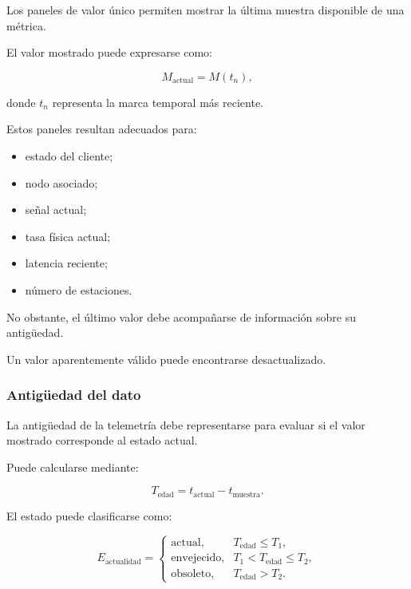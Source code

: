 Los paneles de valor único permiten mostrar la última muestra disponible
de una métrica.

El valor mostrado puede expresarse como:

\[
    M_{\mathrm{actual}}
    =
    M(t_n),
\]

donde \(t_n\) representa la marca temporal más reciente.

Estos paneles resultan adecuados para:

\begin{itemize}
    \item estado del cliente;

    \item nodo asociado;

    \item señal actual;

    \item tasa física actual;

    \item latencia reciente;

    \item número de estaciones.
\end{itemize}

No obstante, el último valor debe acompañarse de información sobre su
antigüedad.

Un valor aparentemente válido puede encontrarse desactualizado.


\subsubsection*{Antigüedad del dato}

La antigüedad de la telemetría debe representarse para evaluar si el
valor mostrado corresponde al estado actual.

Puede calcularse mediante:

\[
    T_{\mathrm{edad}}
    =
    t_{\mathrm{actual}}
    -
    t_{\mathrm{muestra}}.
\]

El estado puede clasificarse como:

\[
    E_{\mathrm{actualidad}}
    =
    \begin{cases}
        \text{actual}, &
        T_{\mathrm{edad}}
        \leq
        T_1,\\
        \text{envejecido}, &
        T_1
        <
        T_{\mathrm{edad}}
        \leq
        T_2,\\
        \text{obsoleto}, &
        T_{\mathrm{edad}}
        >
        T_2.
    \end{cases}
\]

